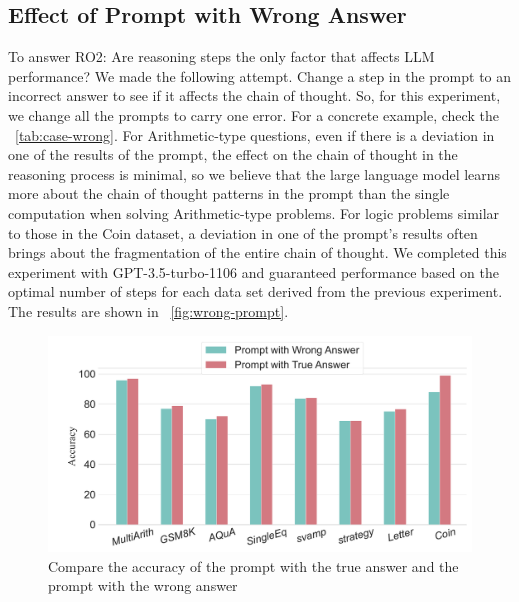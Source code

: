 \documentclass[11pt]{article}
\begin{document}
\subsection{Effect of Prompt with Wrong Answer}
\label{section4.3}
To answer RO2: Are reasoning steps the only factor that affects LLM performance? We made the following attempt. Change a step in the prompt to an incorrect answer to see if it affects the chain of thought. So, for this experiment, we change all the prompts to carry one error. For a concrete example, check the ~\autoref{tab:case-wrong}. For Arithmetic-type questions, even if there is a deviation in one of the results of the prompt, the effect on the chain of thought in the reasoning process is minimal, so we believe that the large language model learns more about the chain of thought patterns in the prompt than the single computation when solving Arithmetic-type problems. For logic problems similar to those in the Coin dataset, a deviation in one of the prompt's results often brings about the fragmentation of the entire chain of thought. We completed this experiment with GPT-3.5-turbo-1106 and guaranteed performance based on the optimal number of steps for each data set derived from the previous experiment. The results are shown in ~\autoref{fig:wrong-prompt}.
\begin{figure}[t]
    \centering
    \includegraphics[width=1\linewidth]{wrong_answer.pdf}
\caption{Compare the accuracy of the prompt with the true answer and the prompt with the wrong answer}
\label{fig:wrong-prompt}
\end{figure}
\end{document}
